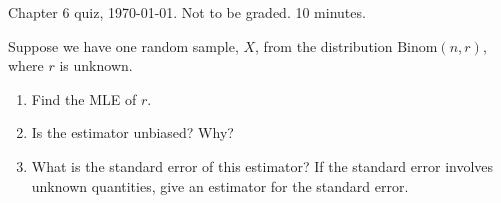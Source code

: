 \documentclass[12pt]{article}
\begin{document}
\thispagestyle{empty}

Chapter 6 quiz, \today. Not to be graded. 10 minutes.
\bigskip

Suppose we have one random sample, $X$, from the distribution
$\text{Binom}(n, r)$, where $r$ is unknown.
\begin{enumerate}
\item Find the MLE of $r$.
\item Is the estimator unbiased? Why?
\item What is the standard error of this estimator?
    If the standard error involves unknown quantities,
    give an estimator for the standard error.
\end{enumerate}
\end{document}
